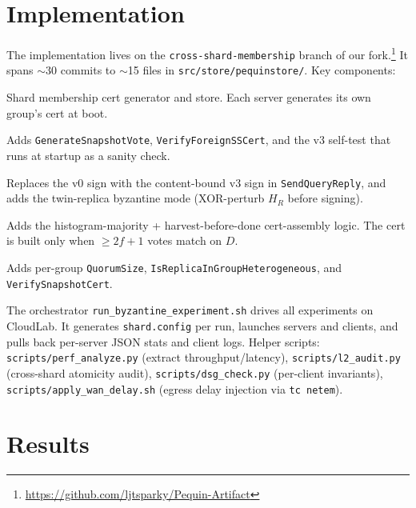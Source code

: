 \documentclass[letterpaper,twocolumn,10pt]{article}
\begin{document}
\section{Implementation}

The implementation lives on the
\texttt{cross-shard-membership} branch of our
fork.\footnote{\url{https://github.com/ljtsparky/Pequin-Artifact}} It
spans $\sim$30 commits to $\sim$15 files in
\texttt{src/store/pequinstore/}. Key components:

\begin{description}\setlength{\itemsep}{2pt}
\item[\texttt{membership.h/cc}] Shard membership cert generator and
      store. Each server generates its own group's cert at boot.
\item[\texttt{server.cc}] Adds \texttt{GenerateSnapshotVote},
      \texttt{VerifyForeignSSCert}, and the v3 self-test that runs at
      startup as a sanity check.
\item[\texttt{querysync-server.cc}] Replaces the v0 sign with the
      content-bound v3 sign in \texttt{SendQueryReply}, and adds the
      twin-replica byzantine mode (XOR-perturb $H_R$ before signing).
\item[\texttt{querysync-client.cc}] Adds the histogram-majority +
      harvest-before-done cert-assembly logic. The cert is built only
      when $\geq 2f{+}1$ votes match on $D$.
\item[\texttt{common.cc}] Adds per-group \texttt{QuorumSize},
      \texttt{IsReplicaInGroupHeterogeneous}, and
      \texttt{VerifySnapshotCert}.
\end{description}

The orchestrator \texttt{run\_byzantine\_experiment.sh} drives all
experiments on CloudLab. It generates \texttt{shard.config} per run,
launches servers and clients, and pulls back per-server JSON stats and
client logs. Helper scripts:
\texttt{scripts/perf\_analyze.py} (extract throughput/latency),
\texttt{scripts/l2\_audit.py} (cross-shard atomicity audit),
\texttt{scripts/dsg\_check.py} (per-client invariants),
\texttt{scripts/apply\_wan\_delay.sh} (egress delay injection via
\texttt{tc netem}).


\section{Results}
\end{document}
